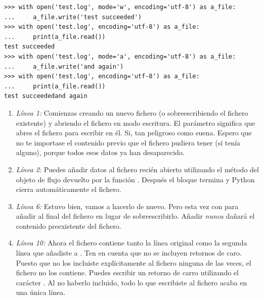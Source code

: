 \noindent\begin{minipage}{\textwidth}
\begin{lstlisting}[mathescape=True]
>>> with open('test.log', mode='w', encoding='utf-8') as a_file:
...     a_file.write('test succeeded')
>>> with open('test.log', encoding='utf-8') as a_file:
...     print(a_file.read())                              
test succeeded
>>> with open('test.log', mode='a', encoding='utf-8') as a_file:
...     a_file.write('and again')
>>> with open('test.log', encoding='utf-8') as a_file:
...     print(a_file.read())                              
test succeededand again
\end{lstlisting}
\end{minipage}

\begin{enumerate}

\item \emph{Línea 1:} Comienzas creando un nuevo fichero  (o sobreescribiendo el fichero existente) y abriendo el fichero en modo escritura. El parámetro  significa que abres el fichero para escribir en él. Si, tan peligroso como suena. Espero que no te importase el contenido previo que el fichero pudiera tener (si tenía alguno), porque todos esos datos ya han desaparecido.

\item \emph{Línea 2:} Puedes añadir datos al fichero recién abierto utilizando el método  del objeto de flujo devuelto por la función . Después el bloque  termina y Python cierra automáticamente el fichero.

\item \emph{Línea 6:}  Estuvo bien, vamos a hacerlo de nuevo. Pero esta vez con  para añadir al final del fichero en lugar de sobreescribirlo. Añadir \emph{nunca} dañará el contenido preexistente del fichero.

\item \emph{Línea 10:} Ahora el fichero contiene tanto la línea original como la segunda línea que añadiste a . Ten en cuenta que no se incluyen retornos de caro. Puesto que no los incluiste explícitamente al fichero ninguna de las veces, el fichero no los contiene. Puedes escribir un retorno de carro utilizando el carácter . Al no haberlo incluido, todo lo que escribiste al fichero acaba en una única línea.

\end{enumerate}

